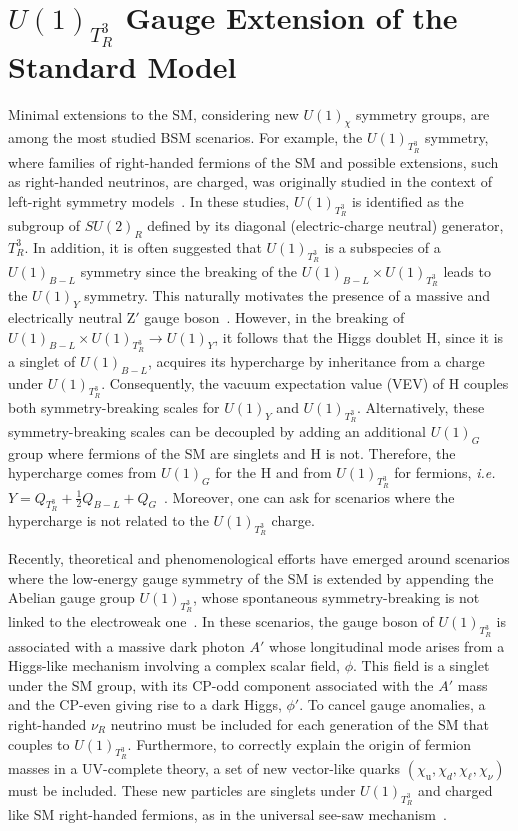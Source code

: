 \chapter{$U(1)_{T^3_R}$ Gauge Extension of the Standard Model}

Minimal extensions to the SM, considering new $U(1)_{\chi}$ symmetry groups, are among the most studied BSM scenarios. For example, the  $U(1)_{T^3_R}$ symmetry, where families of right-handed fermions of the SM and possible extensions, such as right-handed neutrinos, are charged, was originally studied in the context of left-right symmetry models~\parencite{Assad:2017iib, MohapatraPati1975, SenjanovicMohapatra1975}. In these studies, $U(1)_{T^3_R}$ is identified as the subgroup of $SU(2)_R$ defined by its diagonal (electric-charge neutral) generator, $T^3_R$. In addition, it is often suggested that  $U(1)_{T^3_R}$ is a subspecies of a $U(1)_{B-L}$ symmetry since the breaking of the $U(1)_{B-L} \times U(1)_{T^3_R}$ leads to the $ U(1)_Y$ symmetry. This naturally motivates the presence of a massive and electrically neutral $\textrm{Z}'$ gauge boson~\parencite{DiLuzio2018, Baker2019, Michaels:2020fzj, Dev:2021otb, Florez2023}. However, in the breaking of  $U(1)_{B-L} \times U(1)_{T^3_R} \rightarrow U(1)_Y$, it follows that the Higgs doublet $\mathrm{H}$, since it is a singlet of $U(1)_{B-L}$,  acquires its hypercharge by inheritance from a charge under $U(1)_{T^3_R}$. Consequently, the vacuum expectation value (VEV) of $\mathrm{H}$  couples both symmetry-breaking scales for $U(1)_Y$ and $U(1)_{T^3_R}$. Alternatively, these symmetry-breaking scales can be decoupled by adding an additional $U(1)_G$ group where fermions of the SM are singlets and $\mathrm{H}$ is not. Therefore, the hypercharge comes from $U(1)_G$ for the $\mathrm{H}$ and from $U(1)_{T^3_R}$ for fermions, \textit{i.e.} $Y=Q_{T^3_R}+\frac{1}{2}Q_{B-L} + Q_G$~\parencite{Dutta:2022qvn}. Moreover, one can ask for scenarios where the hypercharge is not related to the $U(1)_{T^{3}_{R}}$ charge. 

Recently, theoretical and phenomenological efforts have emerged around scenarios where the low-energy gauge symmetry of the SM is extended by appending the Abelian gauge group $U(1)_{T^{3}_{R}}$, whose spontaneous symmetry-breaking is not linked to the electroweak one~\parencite{Dutta2019, Dutta2020, Dutta2020b,Dutta2022, PhysRevD.107.095019, Dutta2023}. In these scenarios, the gauge boson of $U(1)_{T^3_R}$ is associated with a massive dark photon $A'$ whose longitudinal mode arises from a Higgs-like mechanism involving a complex scalar field, $\phi$. This field is a singlet under the SM group, with its CP-odd component associated with the $A'$ mass and the CP-even giving rise to a dark Higgs, $\phi'$. To cancel gauge anomalies, a right-handed $\nu_R$ neutrino must be included for each generation of the SM that couples to $U(1)_{T^3_R}$. Furthermore, to correctly explain the origin of fermion masses in a UV-complete theory, a set of new vector-like quarks $(\chi_\mathrm{u}, \chi_d,\chi_\ell, \chi_\nu)$ must be included. These new particles are singlets under $U(1)_{T^3_R}$ and charged like SM right-handed fermions, as in the universal see-saw mechanism~\parencite{Berezhiani, Chang1987, Davidson1987, Rajpoot1987, Babu1989, Babu1990}.

